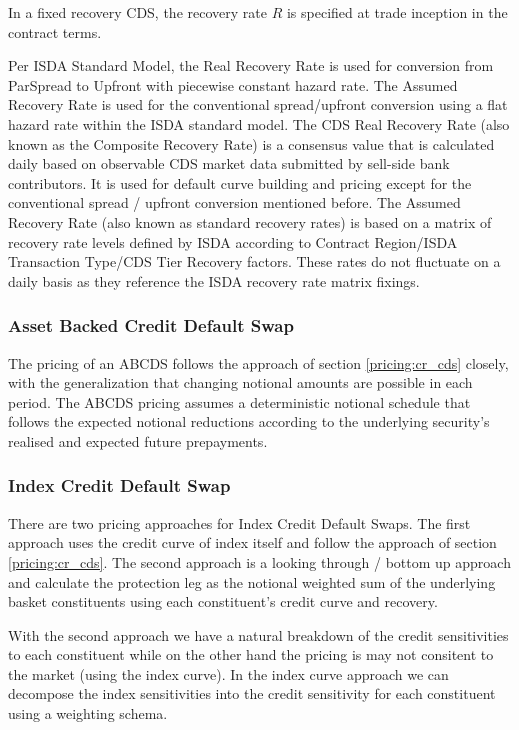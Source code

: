 In a fixed recovery CDS, the recovery rate $R$ is specified at trade inception in the 
contract terms.

Per ISDA Standard Model, the Real Recovery Rate is used for conversion from ParSpread to Upfront with piecewise constant hazard rate. 
The Assumed Recovery Rate is used for the conventional spread/upfront conversion using a flat hazard rate within the ISDA standard model.
The CDS Real Recovery Rate (also known as the Composite Recovery Rate) is a consensus value that is calculated daily based on observable CDS market data submitted 
by sell-side bank contributors. It is used for default curve building and pricing except for the conventional spread / upfront conversion mentioned before.
The Assumed Recovery Rate (also known as standard recovery rates) is based on a matrix of recovery rate levels defined by ISDA according to Contract Region/ISDA Transaction Type/CDS Tier Recovery factors.
These rates do not fluctuate on a daily basis as they reference the ISDA recovery rate matrix fixings.

\subsubsection{Asset Backed Credit Default Swap}
\label{pricing:cr_abcds}

The pricing of an ABCDS follows the approach of section \ref{pricing:cr_cds} closely,
with the generalization that changing notional amounts are possible in each period.
The ABCDS pricing assumes a deterministic notional schedule that follows the expected
notional reductions according to the underlying security's realised and expected future prepayments.

\subsubsection{Index Credit Default Swap}
\label{pricing:cr_index_cds}

There are two pricing approaches for Index Credit Default Swaps. The first approach uses the credit curve of index itself and follow the approach of section \ref{pricing:cr_cds}. 
The second approach is a looking through / bottom up approach 
and calculate the protection leg as the notional weighted sum of the underlying basket constituents using each constituent's credit curve and recovery.

With the second approach we have a natural breakdown of the 
credit sensitivities to each constituent while on the other hand the pricing is may not consitent to the market (using the index curve).
In the index curve approach we can decompose the index sensitivities into the credit sensitivity for each constituent using a
weighting schema. 

